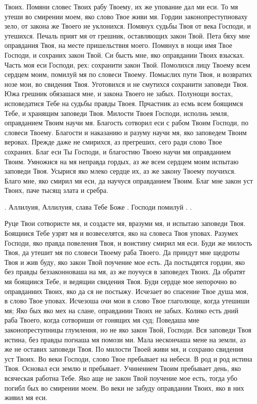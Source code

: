 \begin{mymulticols}
Твоих. Помяни словес Твоих рабу Твоему, их же упование дал ми еси. То мя утеши во смирении моем, яко слово Твое живи мя. Гордии законопреступноваху зело, от закона же Твоего не уклонихся. Помянух судьбы Твоя от века Господи, и утешихся. Печаль прият мя от грешник, оставляющих закон Твой. Пета бяху мне оправдания Твоя, на месте пришельствия моего. Помянух в нощи имя Твое Господи, и сохраних закон Твой. Си бысть мне, яко оправдании Твоих взысках. Часть моя еси Господи, рех: сохранити закон Твой. Помолихся лицу Твоему всем сердцем моим, помилуй мя по словеси Твоему. Помыслих пути Твоя, и возвратих нозе мои, во свидения Твоя. Уготовихся и не смутихся сохранити заповеди Твоя. Южа грешник обязашася мне, и закона Твоего не забых. Полунощи востах, исповедатися Тебе на судьбы правды Твоея. Прчастник аз есмь всем боящимся Тебе, и хранящим заповеди Твоя. Милости Твоея Господи, исполнь земля, оправданием Твоим научи мя. Благость сотворил еси с рабом Твоим Господи, по словеси Твоему. Благости и наказанию и разуму научи мя, яко заповедем Твоим веровах. Прежде даже не смирихся, аз прегреших, сего ради слово Твое сохраних. Благ еси Ты Господи, и благостию Твоею научи мя оправданием Твоим. Умножися на мя неправда гордых, аз же всем сердцем моим испытаю заповеди Твоя. Усырися яко млеко сердце их, аз же закону Твоему поучихся. Благо мне, яко смирил мя еси, да научуся оправданием Твоим. Благ мне закон уст Твоих, паче тысящ злата и сребра.


. Аллилуия, Аллилуия, слава Тебе Боже . Господи помилуй . .


Руце Твои сотвористе мя, и создасте мя, вразуми мя, и испытаю заповеди Твоя. Боящиися Тебе узрят мя и возвеселятся, яко на словеса Твоя уповах. Разумех Господи, яко правда повеления Твоя, и воистину смирил мя еси. Буди же милость Твоя, да утешит мя по словеси Твоему раба Твоего. Да приидут мне щедроты Твоя и жив буду, яко закон Твой поучение мое есть. Да постыдятся гордии, яко без правды беззаконноваша на мя, аз же поучуся в заповедех Твоих. Да обратят мя боящиися Тебе, и ведящии свидения Твоя. Буди сердце мое непорочно во оправданиих Твоих, яко да ся не постыжу. Исчезает во спасение Твое душа моя, в слово Твое уповах. Исчезоша очи мои в слово Твое глаголюще, когда утешиши мя; Яко бых яко мех на слане, оправдании Твоих не забых. Колико есть дний раба Твоего, когда сотвориши от гонящих мя суд; Поведаша мне законопреступницы глумления, но не яко закон Твой, Господи. Вся заповеди Твоя истина, без правды погнаша мя помози ми. Мала нескончаша мене на земли, аз же не оставих заповеди Твоя. По милости Твоей живи мя, и сохраню свидения уст Твоих. Во веки Господи, слово Твое пребывает на небеси. В род и род истина Твоя. Основал еси землю и пребывает. Учинением Твоим пребывает день, яко всяческая работна Тебе. Яко аще не закон Твой поучение мое есть, тогда убо погибл бых во смирении моем. Во веки не забуду оправдании Твоих, яко в них живил мя еси.


\end{mymulticols}
